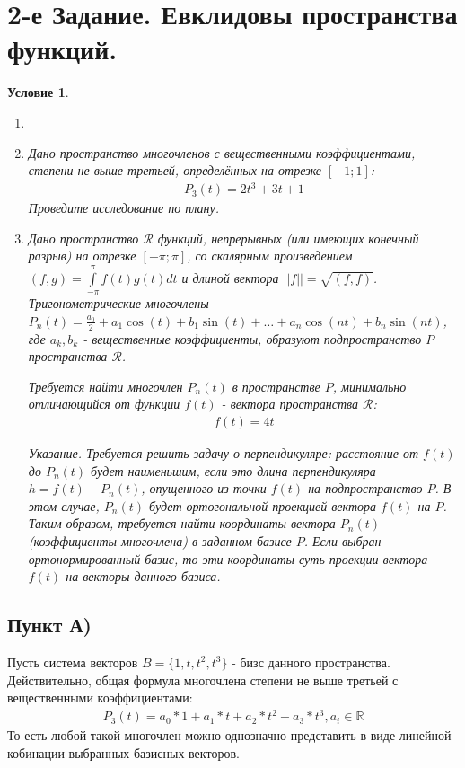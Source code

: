 \documentclass[12pt, a4paper]{article}
\newtheorem*{task}{Условие}
\begin{document}
\section{2-е Задание. Евклидовы пространства функций.}
\begin{task}
\begin{enumerate}
\item[]

\item[А)] Дано пространство многочленов с вещественными коэффициентами, степени не выше третьей, определённых на отрезке $\left[-1;1\right]$:
\begin{equation*}
\begin{aligned}
P_3(t)=2t^3+3t+1
\end{aligned}
\end{equation*}
Проведите исследование по плану.

\item[Б)] Дано пространство $\mathcal{R}$ функций, непрерывных (или имеющих конечный разрыв) на отрезке $\left[-\pi;\pi\right]$, со скалярным произведением $(f,g)=\int\limits_{-\pi}^{\pi}f(t)g(t)dt$ и длиной вектора $||f||=\sqrt{(f,f)}$. Тригонометрические многочлены $P_n(t)=\frac{a_0}{2} + a_1\cos(t)+b_1\sin(t)+\ldots+a_n\cos(nt)+b_n\sin(nt)$, где $a_k, b_k$ - вещественные коэффициенты, образуют подпространство $P$ пространства  $\mathcal{R}$.

Требуется найти многочлен $P_n(t)$ в пространстве $P$, минимально отличающийся от функции $f(t)$ - вектора пространства $\mathcal{R}$:
\begin{equation} \label{2taskFunc}
\begin{aligned}
f(t)=4t
\end{aligned}
\end{equation}

Указание. Требуется решить задачу о перпендикуляре: расстояние от $f(t)$ до $P_n(t)$ будет наименьшим, если это длина перпендикуляра $h=f(t)-P_n(t)$, опущенного из точки $f(t)$ на подпространство $P$. В этом случае, $P_n(t)$ будет ортогональной проекцией вектора $f(t)$ на $P$. Таким образом, требуется найти координаты вектора $P_n(t)$ (коэффициенты многочлена) в заданном базисе $P$. Если выбран ортонормированный базис, то эти координаты суть проекции вектора $f(t)$ на векторы данного базиса. 
\end{enumerate}
\end{task}
\subsection{Пункт А)}
Пусть система векторов $B=\{1,t,t^2,t^3\}$ - бизс данного пространства. Действительно, общая формула многочлена степени не выше третьей с вещественными коэффициентами:
\begin{equation*}
\begin{aligned}
P_3(t)=a_0 * 1 + a_1*t + a_2 * t^2 + a_3 * t^3, a_i \in \mathbb{R}
\end{aligned}
\end{equation*}
То есть любой такой многочлен можно однозначно представить в виде линейной кобинации выбранных базисных векторов.
\end{document}
